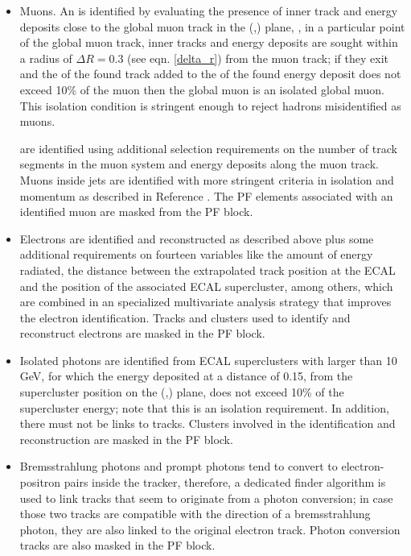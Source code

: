 \begin{itemize}

\item Muons. An  is identified by evaluating the presence of inner track and energy deposits close to the global muon track in the (\etac,\phic) plane, \ie, in a particular point of the global muon track, inner tracks and energy deposits are sought within a radius of $\Delta R=0.3$ (see eqn. \ref{delta_r}) from the muon track; if they exit and the \pt of the found track added to the \Et of the found energy deposit does not exceed 10\% of the muon \pt then the global muon is an isolated global muon. This isolation condition is stringent enough to reject hadrons misidentified as muons.

   are identified using additional selection requirements on the number of track segments in the muon system and energy deposits along the muon track. Muons inside jets are identified with more stringent criteria in isolation and momentum as described in Reference \cite{muon_req}. The PF elements associated with an identified muon are masked from the PF block.  

\item Electrons are identified and reconstructed as described above plus some additional requirements on fourteen variables like the amount of energy radiated, the distance between the extrapolated track position at the ECAL and the position of the associated ECAL supercluster, among others, which are combined in an specialized multivariate analysis strategy that improves the electron identification. Tracks and clusters used to identify and reconstruct electrons are masked in the PF block.  
  
\item Isolated photons are identified from ECAL superclusters with \Et larger than 10 GeV, for which the energy deposited at a distance of 0.15, from the supercluster position on the (\etac,\phic) plane, does not exceed 10\% of the supercluster energy; note that this is an isolation requirement. In addition, there must not be links to tracks. Clusters involved in the identification and reconstruction are masked in the PF block.

\item Bremsstrahlung photons and prompt photons tend to convert to electron-positron pairs inside the tracker, therefore, a dedicated finder algorithm is used to link tracks that seem to originate from a photon conversion; in case those two tracks are compatible with the direction of a bremsstrahlung photon, they are also linked to the original electron track. Photon conversion tracks are also masked in the PF block.


\end{itemize}
